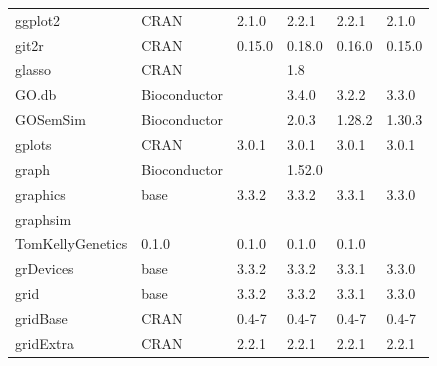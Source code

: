 \begin{longtable}{llllll}
\rowcolor{black!10}
ggplot2                       & \acrshort{CRAN}                      & 2.1.0       & 2.2.1       & 2.2.1          & 2.1.0             \\
\rowcolor{black!5}
git2r                         & \acrshort{CRAN}                      & 0.15.0      & 0.18.0      & 0.16.0         & 0.15.0             \\
\rowcolor{black!10}
glasso                        & \acrshort{CRAN}                      &             & 1.8         &                &                   \\
\rowcolor{black!5}
GO.db                         & Bioconductor              &             & 3.4.0       & 3.2.2          & 3.3.0              \\
\rowcolor{black!10}
GOSemSim                      & Bioconductor              &             & 2.0.3       & 1.28.2         & 1.30.3            \\
\rowcolor{black!5}
gplots                        & \acrshort{CRAN}                      & 3.0.1       & 3.0.1       & 3.0.1          & 3.0.1              \\
\rowcolor{black!10}
graph                         & Bioconductor              &             & 1.52.0      &                &                   \\
\rowcolor{black!5}
graphics                      & base                      & 3.3.2       & 3.3.2       & 3.3.1          & 3.3.0              \\
\rowcolor{black!10}
graphsim                      & \begin{tabular}[c]{@{}l@{}}GitHub \\ TomKellyGenetics \end{tabular}  & 0.1.0       & 0.1.0       & 0.1.0          & 0.1.0             \\
\rowcolor{black!5}
grDevices                     & base                      & 3.3.2       & 3.3.2       & 3.3.1          & 3.3.0              \\
\rowcolor{black!10}
grid                          & base                      & 3.3.2       & 3.3.2       & 3.3.1          & 3.3.0             \\
\rowcolor{black!5}
gridBase                      & \acrshort{CRAN}                      & 0.4-7       & 0.4-7       & 0.4-7          & 0.4-7              \\
\rowcolor{black!10}
gridExtra                     & \acrshort{CRAN}                      & 2.2.1       & 2.2.1       & 2.2.1          & 2.2.1             \\

\end{longtable}

